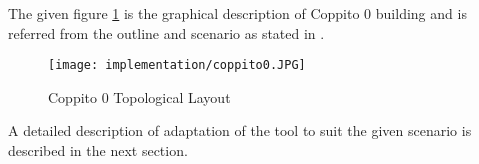 The given figure \ref{Coppito0 layout} is the graphical description of Coppito 0 building and is referred from the outline and scenario as stated in \cite{ref5}.  

\begin{figure}[H]
  \centering
  \texttt{[image: implementation/coppito0.JPG]}
	\caption{Coppito 0 Topological Layout}
  \label{Coppito0 layout}
\end{figure}

A detailed description of adaptation of the tool to suit the given scenario is described in the next section.

 

